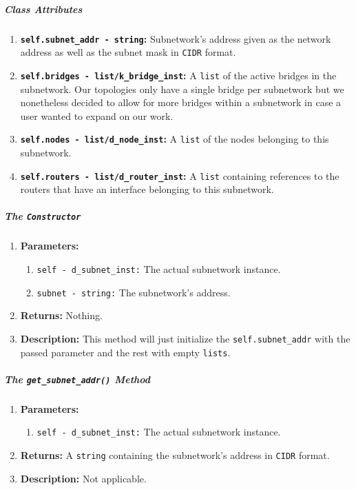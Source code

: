                     \subparagraph{Class Attributes}
                        \begin{enumerate}
                            \item \textbf{\texttt{self.subnet\_addr - string}:} Subnetwork's address given as the network address as well as the subnet mask in \texttt{CIDR} format.
                            \item \textbf{\texttt{self.bridges - list/k\_bridge\_inst}:} A \texttt{list} of the active bridges in the subnetwork. Our topologies only have a single bridge per subnetwork but we nonetheless decided to allow for more bridges within a subnetwork in case a user wanted to expand on our work.
                            \item \textbf{\texttt{self.nodes - list/d\_node\_inst}:} A \texttt{list} of the nodes belonging to this subnetwork.
                            \item \textbf{\texttt{self.routers - list/d\_router\_inst}:} A \texttt{list} containing references to the routers that have an interface belonging to this subnetwork.
                        \end{enumerate}

                    \subparagraph{The \texttt{Constructor}}
                        \begin{enumerate}
                            \item \textbf{Parameters:}
                            \begin{enumerate}
                                \item \texttt{self - d\_subnet\_inst:} The actual subnetwork instance.
                                \item \texttt{subnet - string:} The subnetwork's address.
                            \end{enumerate}
                            \item \textbf{Returns:} Nothing.
                            \item \textbf{Description:} This method will just initialize the \texttt{self.subnet\_addr} with the passed parameter and the rest with empty \texttt{lists}.
                        \end{enumerate}

                    \subparagraph{The \texttt{get\_subnet\_addr()} Method}
                        \begin{enumerate}
                            \item \textbf{Parameters:}
                            \begin{enumerate}
                                \item \texttt{self - d\_subnet\_inst:} The actual subnetwork instance.
                            \end{enumerate}
                            \item \textbf{Returns:} A \texttt{string} containing the subnetwork's address in \texttt{CIDR} format.
                            \item \textbf{Description:} Not applicable.
                        \end{enumerate}

